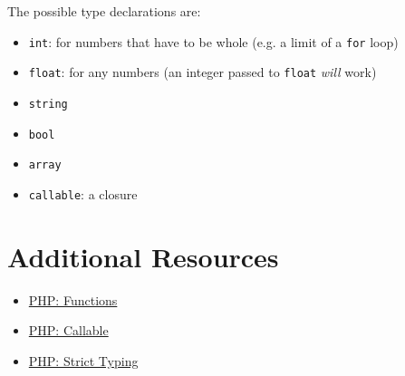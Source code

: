 The possible type declarations are:

\begin{itemize}
    \item \texttt{int}: for numbers that have to be whole (e.g. a limit of a \texttt{for} loop)
    \item \texttt{float}: for any numbers (an integer passed to \texttt{float} \textit{will} work)
    \item \texttt{string}
    \item \texttt{bool}
    \item \texttt{array}
    \item \texttt{callable}: a closure
\end{itemize}


\section{Additional Resources}

\begin{itemize}[leftmargin=*]
    \item \href{http://www.php.net/manual/en/functions.user-defined.php}{PHP: Functions}
    \item \href{http://www.php.net/manual/en/language.types.callable.php}{PHP: Callable}
    \item \href{http://www.php.net/manual/en/functions.arguments.php#functions.arguments.type-declaration.strict}{PHP: Strict Typing}
\end{itemize}

